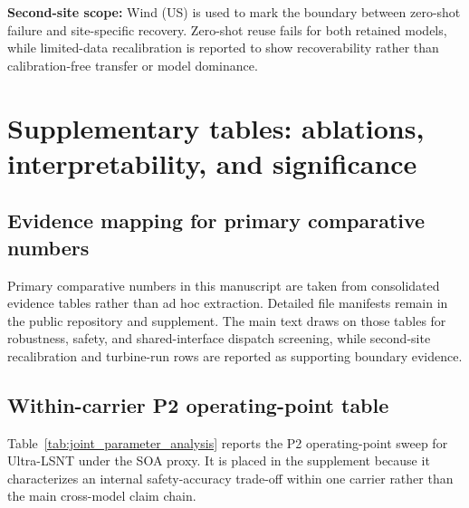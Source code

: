 \documentclass[review,1p,times]{elsarticle}
\begin{document}
\textbf{Second-site scope:} Wind (US) is used to mark the boundary between zero-shot failure and site-specific recovery. Zero-shot reuse fails for both retained models, while limited-data recalibration is reported to show recoverability rather than calibration-free transfer or model dominance.

\section{Supplementary tables: ablations, interpretability, and significance}\label{app:supp_tables}

\subsection{Evidence mapping for primary comparative numbers}
\label{subsec:evidence_mapping}
Primary comparative numbers in this manuscript are taken from consolidated evidence tables rather than ad hoc extraction. Detailed file manifests remain in the public repository and supplement. The main text draws on those tables for robustness, safety, and shared-interface dispatch screening, while second-site recalibration and turbine-run rows are reported as supporting boundary evidence.

\subsection{Within-carrier P2 operating-point table}
\label{subsec:app_p2_operating_points}
Table~\ref{tab:joint_parameter_analysis} reports the P2 operating-point sweep for Ultra-LSNT under the SOA proxy. It is placed in the supplement because it characterizes an internal safety-accuracy trade-off within one carrier rather than the main cross-model claim chain.
\end{document}
